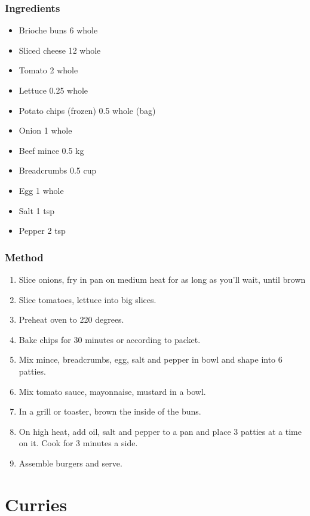 \documentclass[]{article}
\begin{document}
\subsubsection*{\Large Ingredients}
\begin{multicols}{2}
\begin{itemize}
 \item Brioche buns \hfill 6 whole
 \item Sliced cheese \hfill 12 whole
 \item Tomato \hfill 2 whole
 \item Lettuce \hfill 0.25 whole
 \item Potato chips (frozen) \hfill 0.5 whole (bag)
 \item Onion \hfill 1 whole
 \item Beef mince \hfill 0.5 kg
 \item Breadcrumbs \hfill 0.5 cup
 \item Egg \hfill 1 whole
 \item Salt \hfill 1 tsp
 \item Pepper \hfill 2 tsp
\end{itemize}
\end{multicols}
\subsubsection*{\Large Method}
\begin{enumerate}[font=\huge\color{accent}]
	\item Slice onions, fry in pan on medium heat for as long as you'll wait, until brown
	\item Slice tomatoes, lettuce into big slices.
	\item Preheat oven to 220 degrees.
	\item Bake chips for 30 minutes or according to packet.
	\item Mix mince, breadcrumbs, egg, salt and pepper in bowl and shape into 6 patties.
	\item Mix tomato sauce, mayonnaise, mustard in a bowl.
	\item In a grill or toaster, brown the inside of the buns.
	\item On high heat, add oil, salt and pepper to a pan and place 3 patties at a time on it. Cook for 3 minutes a side.
	\item Assemble burgers and serve.
\end{enumerate}
\newpage
{}
\section*{\center\Huge\color{accent}Curries}
\label{cat:Curries}
\label{rec:Chickpea Curry}
\end{document}
